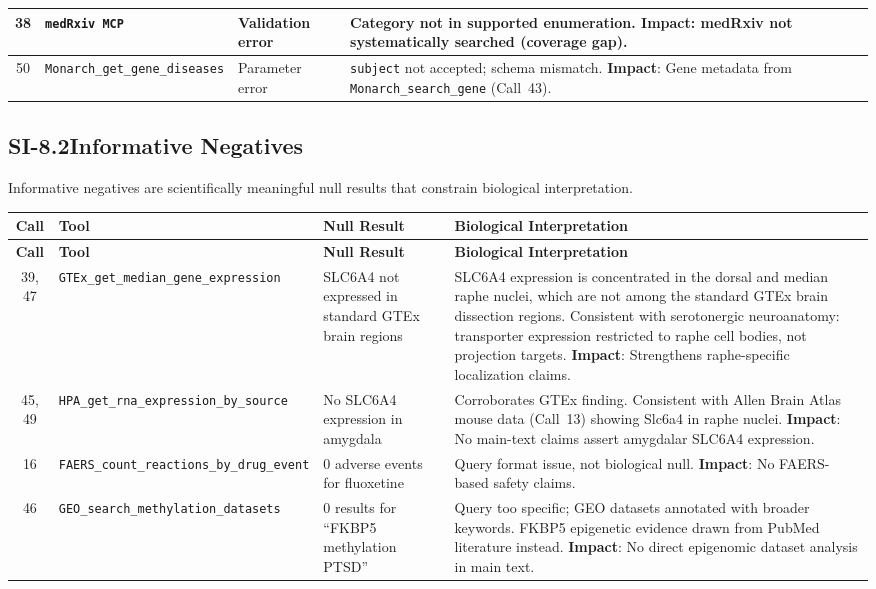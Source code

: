 {\begin{longtable}{@{}c p{2.8cm} p{2.8cm} p{5.8cm}@{}}
38 &
\texttt{medRxiv MCP} &
Validation error &
Category not in supported enumeration.  \textbf{Impact}: medRxiv not
systematically searched (coverage gap). \\
\midrule

50 &
\texttt{Monarch\_get\_\allowbreak gene\_diseases} &
Parameter error &
\texttt{subject} not accepted; schema mismatch.  \textbf{Impact}: Gene
metadata from \texttt{Monarch\_search\_gene} (Call~43). \\

\end{longtable}
}

\subsection*{SI-8.2\quad Informative Negatives}

Informative negatives are scientifically meaningful null results that
constrain biological interpretation.

{\small
\begin{longtable}{@{}c p{2.8cm} p{2.8cm} p{5.8cm}@{}}
\toprule
\textbf{Call} & \textbf{Tool} & \textbf{Null Result} &
\textbf{Biological Interpretation} \\
\midrule
\endfirsthead
\toprule
\textbf{Call} & \textbf{Tool} & \textbf{Null Result} &
\textbf{Biological Interpretation} \\
\midrule
\endhead
\bottomrule
\endlastfoot

39, 47 &
\texttt{GTEx\_get\_median\_\allowbreak gene\_expression} &
SLC6A4 not expressed in standard GTEx brain regions &
SLC6A4 expression is concentrated in the dorsal and median raphe nuclei,
which are not among the standard GTEx brain dissection regions.  Consistent
with serotonergic neuroanatomy: transporter expression restricted to
raphe cell bodies, not projection targets.  \textbf{Impact}: Strengthens
raphe-specific localization claims. \\
\midrule

45, 49 &
\texttt{HPA\_get\_rna\_\allowbreak expression\_\allowbreak by\_source} &
No SLC6A4 expression in amygdala &
Corroborates GTEx finding.  Consistent with Allen Brain Atlas mouse data
(Call~13) showing Slc6a4 in raphe nuclei.  \textbf{Impact}: No main-text
claims assert amygdalar SLC6A4 expression. \\
\midrule

16 &
\texttt{FAERS\_count\_\allowbreak reactions\_by\_\allowbreak drug\_event} &
0 adverse events for fluoxetine &
Query format issue, not biological null.  \textbf{Impact}: No FAERS-based
safety claims. \\
\midrule

46 &
\texttt{GEO\_search\_\allowbreak methylation\_\allowbreak datasets} &
0 results for ``FKBP5 methylation PTSD'' &
Query too specific; GEO datasets annotated with broader keywords.  FKBP5
epigenetic evidence drawn from PubMed literature instead.
\textbf{Impact}: No direct epigenomic dataset analysis in main text. \\

\end{longtable}
}

